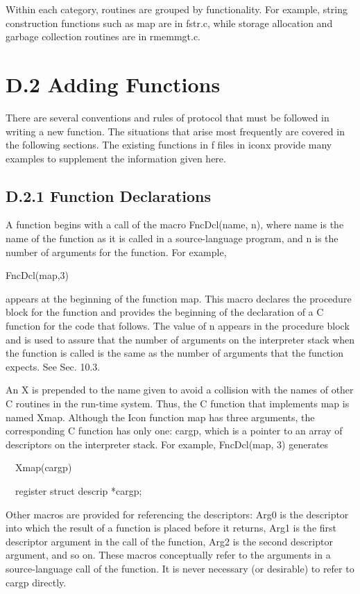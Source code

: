Within each category, routines are grouped by functionality. For example, string construction functions such as map are
in fstr.c, while storage allocation and garbage collection routines are in rmemmgt.c.

\section{D.2 Adding Functions}

There are several conventions and rules of protocol that must be
followed in writing a new function. The situations that arise most
frequently are covered in the following sections. The existing
functions in f files in iconx provide many examples to supplement the
information given here.

\subsection[D.2.1 Function Declarations]{D.2.1 Function Declarations}

A function begins with a call of the macro FncDcl(name, n), where name
is the name of the function as it is called in a source-language
program, and n is the number of arguments for the function. For
example,

{\ttfamily\mdseries
FncDcl(map,3)}

\noindent appears at the beginning of the function map. This macro
declares the procedure block for the function and provides the
beginning of the declaration of a C function for the code that
follows. The value of n appears in the procedure block and is used to
assure that the number of arguments on the interpreter stack when the
function is called is the same as the number of arguments that the
function expects. See Sec. 10.3.

An X is prepended to the name given to avoid a collision with the
names of other C routines in the run-time system.  Thus, the C
function that implements map is named Xmap. Although the Icon function
map has three arguments, the corresponding C function has only one:
cargp, which is a pointer to an array of descriptors on the
interpreter stack.  For example, FncDcl(map, 3) generates

{\ttfamily\mdseries
\ \ Xmap(cargp)}

{\ttfamily\mdseries
\ \ register struct descrip *cargp;}


Other macros are provided for referencing the descriptors: Arg0 is the descriptor into which the result of a function is
placed before it returns, Arg1 is the first descriptor argument in the call of the function, Arg2 is the second
descriptor argument, and so on. These macros conceptually refer to the arguments in a source-language call of the
function. It is never necessary (or desirable) to refer to cargp directly.


